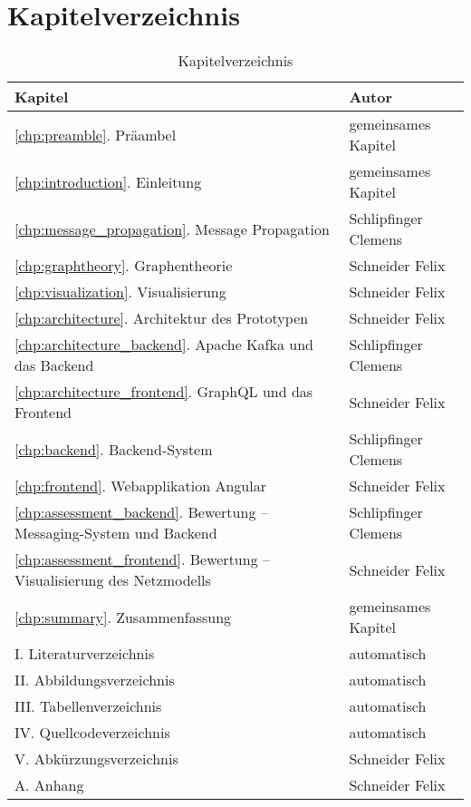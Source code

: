 \section{Kapitelverzeichnis}

\begin{table}
    \renewcommand{\arraystretch}{1.6}
    \begin{tabular}{m{10cm}|m{5.4cm}}
         Kapitel & Autor\\
         \hline
         \ref{chp:preamble}. Präambel & gemeinsames Kapitel \\
         \ref{chp:introduction}. Einleitung & gemeinsames Kapitel \\
         \ref{chp:message_propagation}. Message Propagation & Schlipfinger Clemens \\
         \ref{chp:graphtheory}. Graphentheorie & Schneider Felix \\
         \ref{chp:visualization}. Visualisierung & Schneider Felix \\
         \ref{chp:architecture}. Architektur des Prototypen & Schneider Felix \\
         \ref{chp:architecture_backend}. Apache Kafka und das Backend & Schlipfinger Clemens \\
         \ref{chp:architecture_frontend}. GraphQL und das Frontend & Schneider Felix \\
         \ref{chp:backend}. Backend-System & Schlipfinger Clemens \\
         \ref{chp:frontend}. Webapplikation Angular & Schneider Felix \\
         \ref{chp:assessment_backend}. Bewertung -- Messaging-System und Backend & Schlipfinger Clemens \\
         \ref{chp:assessment_frontend}. Bewertung -- Visualisierung des Netzmodells & Schneider Felix \\
         \ref{chp:summary}. Zusammenfassung & gemeinsames Kapitel \\
         I. Literaturverzeichnis & automatisch \\
         II. Abbildungsverzeichnis & automatisch \\
         III. Tabellenverzeichnis & automatisch \\
         IV. Quellcodeverzeichnis & automatisch \\
         V. Abkürzungsverzeichnis & Schneider Felix \\
         A. Anhang & Schneider Felix \\
    \end{tabular}
    \caption{Kapitelverzeichnis}
    \label{tab:chapterindex}
\end{table}
\newpage